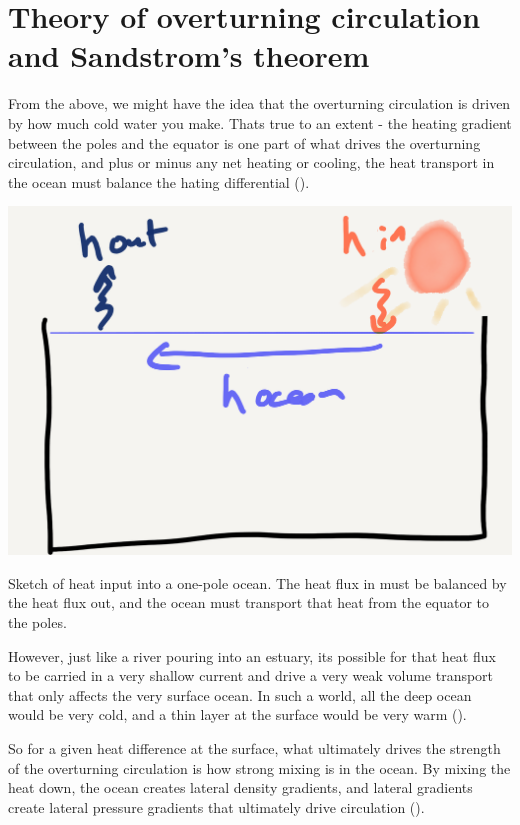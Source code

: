 \section{Theory of overturning circulation and Sandstrom's theorem}

From the above, we might have the idea that the overturning circulation is driven by how much cold water you make.  Thats true to an extent - the heating gradient between the poles and the equator is one part of what drives the overturning circulation, and plus or minus any net heating or cooling, the heat transport in the ocean must balance the hating differential ().  

\begin{marginfigure}
    \includegraphics{figs/WaterMasses/SketchHeatingCooling}
    \caption{Sketch of heat input into a one-pole ocean.  The heat flux in must be balanced by the heat flux out, and the ocean must transport that heat from the equator to the poles.}
    \label{fig:SketchHeatingCooling}  
\end{marginfigure}

However, just like a river pouring into an estuary, its possible for that heat flux to be carried in a very shallow current and drive a very weak volume transport that only affects the very surface ocean.  In such a world, all the deep ocean would be very cold, and a thin layer at the surface would be very warm ().

So for a given heat difference at the surface, what ultimately drives the strength of the overturning circulation is how strong mixing is in the ocean.  By mixing the heat down, the ocean creates lateral density gradients, and lateral gradients create lateral pressure gradients that ultimately drive circulation ().  

